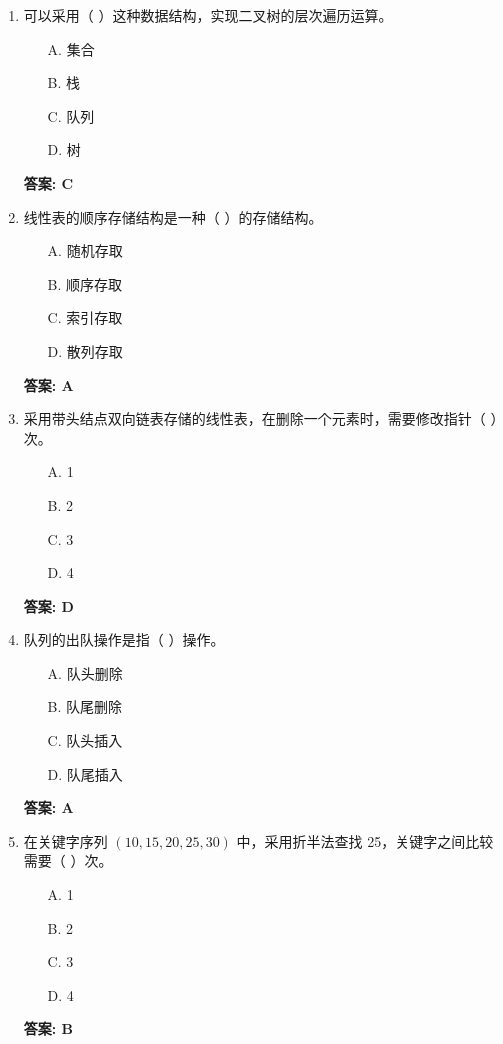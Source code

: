 \documentclass[12pt, a4paper]{article}
\begin{document}
\begin{enumerate}
    \item 可以采用（ ）这种数据结构，实现二叉树的层次遍历运算。
    \begin{enumerate}
        \item[A.] 集合
        \item[B.] 栈
        \item[C.] 队列
        \item[D.] 树
    \end{enumerate}
    \textbf{答案: C}

    \item 线性表的顺序存储结构是一种（ ）的存储结构。
    \begin{enumerate}
        \item[A.] 随机存取
        \item[B.] 顺序存取
        \item[C.] 索引存取
        \item[D.] 散列存取
    \end{enumerate}
    \textbf{答案: A}

    \item 采用带头结点双向链表存储的线性表，在删除一个元素时，需要修改指针（ ）次。
    \begin{enumerate}
        \item[A.] 1
        \item[B.] 2
        \item[C.] 3
        \item[D.] 4
    \end{enumerate}
    \textbf{答案: D}

    \item 队列的出队操作是指（ ）操作。
    \begin{enumerate}
        \item[A.] 队头删除
        \item[B.] 队尾删除
        \item[C.] 队头插入
        \item[D.] 队尾插入
    \end{enumerate}
    \textbf{答案: A}

    \item 在关键字序列 $(10, 15, 20, 25, 30)$ 中，采用折半法查找 25，关键字之间比较需要（ ）次。
    \begin{enumerate}
        \item[A.] 1
        \item[B.] 2
        \item[C.] 3
        \item[D.] 4
    \end{enumerate}
    \textbf{答案: B}


\end{enumerate}
\end{document}

